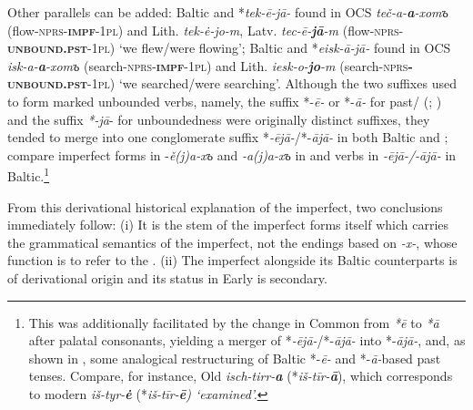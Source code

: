 \documentclass[output=paper]{langsci/langscibook}
\begin{document}
Other parallels can be added: Baltic and  *\textit{tek-ē-jā-} found in OCS \textit{teč-a-\textbf{{a}}-x}\textit{om}\textit{ъ} (flow-\textsc{nprs}-\textbf{\textsc{impf}}\textsc{-1pl}) and Lith. \textit{tek-\.e-jo-m}, Latv. \textit{tec-ē-\textbf{{jā}}-m} (flow-\textsc{nprs}-\textbf{\textsc{unbound.pst}}\textsc{-1pl}) ‘we flew/were flowing’; Baltic and  *\textit{eisk-ā-jā-} found in OCS \textit{isk-a-\textbf{{a}}-x}\textit{om}\textit{ъ} (search-\textsc{nprs}-\textbf{\textsc{impf}}\textsc{-1pl}) and Lith. \textit{iesk-o-\textbf{{jo}}-m} (search-\textsc{nprs}\textbf{\textsc{-unbound.pst}}\textsc{-1pl)} ‘we searched/were searching’. Although the two suffixes used to form marked unbounded verbs, namely, the suffix *-\textit{ē-} or *-\textit{ā-} for past\slash {} (\citealt[387]{Stang1966}; \citealt[356]{Pohl1971}) and the suffix \textit{*-jā}- for unboundedness were originally distinct suffixes, they tended to merge into one conglomerate suffix *\textit{-ējā-}/*-\textit{ājā-} in both Baltic and ; compare imperfect forms in -\textit{ě(j)a-x}\textit{ъ} and \textit{-a(j)a-x}\textit{ъ} in  and verbs in \textit{-ējā-/-ājā-} in Baltic.\footnote{This was additionally facilitated by the change in Common  from \textit{*ē} to \textit{*ā} after palatal consonants, yielding a merger of *\textit{-ējā-}/*-\textit{ājā-} into *-\textit{ājā-}, and, as shown in \citet{Ostrowski2006}, some analogical restructuring of Baltic *-\textit{ē-} and *-\textit{ā-}based past tenses. Compare, for instance, Old  \textit{isch-tirr-\textbf{{a}}} (*\textit{iš-tīr-\textbf{{ā}}}), which corresponds to modern  \textit{iš-tyr-\textbf{{\.e}}} (*\textit{iš-tīr-\textbf{{ē}}) ‘examined’.}
}

From this derivational historical explanation of the  imperfect, two conclusions immediately follow: (i) It is the stem of the imperfect forms itself which carries the grammatical semantics of the imperfect, not the endings based on \textit{-x-}, whose function is to refer to the . (ii) The  imperfect alongside its Baltic counterparts is of derivational origin and its  status in Early  is secondary.
\end{document}
